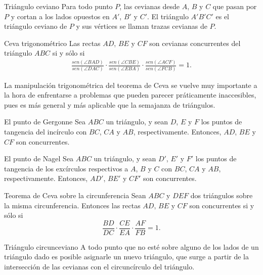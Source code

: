 \begin{section-definition.tcb}{Triángulo ceviano}{}
    Para todo punto $P$, las cevianas desde $A$, $B$ y $C$ que pasan por $P$ y cortan a los lados opuestos en $A'$, $B'$ y $C'$.
    El triángulo $A'B'C'$ es el triángulo ceviano de $P$ y sus vértices se llaman trazas cevianas de $P$.
\end{section-definition.tcb}

\begin{section-theorem.tcb}{Ceva trigonométrico}{}
    Las rectas $AD$, $BE$ y $CF$ son cevianas concurrentes del triángulo $ABC$ si y sólo si
    \begin{gather*}
        \frac{sen(\angle BAD)}{sen(\angle DAC)} \cdot \frac{sen(\angle CBE)}{sen(\angle EBA)} \cdot \frac{sen(\angle ACF)}{sen(\angle FCB)} = 1.
    \end{gather*}
\end{section-theorem.tcb}

La manipulación trigonométrica del teorema de Ceva se vuelve muy importante a la hora de enfrentarse a problemas que pueden parecer práticamente inaccesibles, pues es más general y más aplicable que la semajanza de triángulos.

\begin{section-definition.tcb}{El punto de Gergonne}{}
    Sea $ABC$ un triángulo, y sean $D$, $E$ y $F$ los puntos de tangencia del incírculo con $BC$, $CA$ y $AB$, respectivamente.
    Entonces, $AD$, $BE$ y $CF$ son concurrentes.
\end{section-definition.tcb}

\begin{section-definition.tcb}{El punto de Nagel}{}
    Sea $ABC$ un triángulo, y sean $D'$, $E'$ y $F'$ los puntos de tangencia de los excírculos respectivos a $A$, $B$ y $C$ con $BC$, $CA$ y $AB$, respectivamente.
    Entonces, $AD'$, $BE'$ y $CF'$ son concurrentes.
\end{section-definition.tcb}


\begin{section-theorem.tcb}{Teorema de Ceva sobre la circunferencia}{}
    Sean $ABC$ y $DEF$ dos triángulos sobre la misma circunferencia.
    Entonces las rectas $AD$, $BE$ y $CF$ son concurrentes si y sólo si
    \[\frac{BD}{DC} \cdot \frac{CE}{EA} \cdot \frac{AF}{FB} = 1.\]
\end{section-theorem.tcb}

\begin{section-definition.tcb}{Triángulo circunceviano}{}
    A todo punto que no esté sobre alguno de los lados de un triángulo dado es posible asignarle un nuevo triángulo, que surge a partir de la intersección de las cevianas con el circuncírculo del triángulo.
\end{section-definition.tcb}

